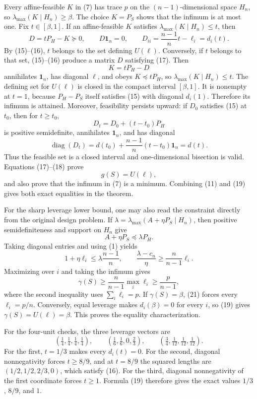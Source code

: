 Every affine-feasible \(K\) in (7) has trace \(p\) on the \((n-1)\)-dimensional space \(H_n\), so \(\lambda_{\max}(K\mid H_n)\geq\beta\).  The choice \(K=P_S\) shows that the infimum is at most one.  Fix \(t\in[\beta,1]\).  If an affine-feasible \(K\) satisfies \(\lambda_{\max}(K\mid H_n)\leq t\), then
\[
D=tP_H-K\succeq0,
\qquad
D\mathbf1_n=0,
\qquad
D_{ii}=\frac{n-1}{n}t-\ell_i=d_i(t).
\tag{17}
\]
By (15)--(16), \(t\) belongs to the set defining \(U(\ell)\).  Conversely, if \(t\) belongs to that set, (15)--(16) produce a matrix \(D\) satisfying (17).  Then
\[
K=tP_H-D
\tag{18}
\]
annihilates \(\mathbf1_n\), has diagonal \(\ell\), and obeys \(K\preceq tP_H\), so \(\lambda_{\max}(K\mid H_n)\leq t\).  The defining set for \(U(\ell)\) is closed in the compact interval \([\beta,1]\).  It is nonempty at \(t=1\), because \(P_H-P_S\) itself satisfies (15) with diagonal \(d_i(1)\).  Therefore its infimum is attained.  Moreover, feasibility persists upward: if \(D_0\) satisfies (15) at \(t_0\), then for \(t\geq t_0\),
\[
D_t=D_0+(t-t_0)P_H
\]
is positive semidefinite, annihilates \(\mathbf1_n\), and has diagonal
\[
\operatorname{diag}(D_t)=d(t_0)+\frac{n-1}{n}(t-t_0)\mathbf1_n=d(t).
\]
Thus the feasible set is a closed interval and one-dimensional bisection is valid.  Equations (17)--(18) prove
\[
g(S)=U(\ell),
\tag{19}
\]
and also prove that the infimum in (7) is a minimum.  Combining (11) and (19) gives both exact equalities in the theorem.

For the sharp leverage lower bound, one may also read the constraint directly from the original design problem.  If
\(\lambda=\lambda_{\max}(A+\eta P_S\mid H_n)\), then positive semidefiniteness and support on \(H_n\) give
\[
A+\eta P_S\preceq\lambda P_H.
\]
Taking diagonal entries and using (1) yields
\[
1+\eta\ell_i\leq\lambda\frac{n-1}{n},
\qquad
\frac{\lambda-c_n}{\eta}\geq\frac{n}{n-1}\ell_i.
\tag{20}
\]
Maximizing over \(i\) and taking the infimum gives
\[
\gamma(S)\geq\frac{n}{n-1}\max_i\ell_i\geq\frac{p}{n-1},
\tag{21}
\]
where the second inequality uses \(\sum_i\ell_i=p\).  If \(\gamma(S)=\beta\), (21) forces every \(\ell_i=p/n\).  Conversely, equal leverage makes \(d_i(\beta)=0\) for every \(i\), so (19) gives \(\gamma(S)=U(\ell)=\beta\).  This proves the equality characterization.

For the four-unit checks, the three leverage vectors are
\[
\left(\tfrac14,\tfrac14,\tfrac14,\tfrac14\right),
\qquad
\left(\tfrac16,\tfrac16,0,\tfrac23\right),
\qquad
\left(\tfrac34,\tfrac1{12},\tfrac1{12},\tfrac1{12}\right).
\tag{22}
\]
For the first, \(t=1/3\) makes every \(d_i(t)=0\).  For the second, diagonal nonnegativity forces \(t\geq8/9\), and at \(t=8/9\) the squared lengths are \((1/2,1/2,2/3,0)\), which satisfy (16).  For the third, diagonal nonnegativity of the first coordinate forces \(t\geq1\).  Formula (19) therefore gives the exact values \(1/3\), \(8/9\), and \(1\).

